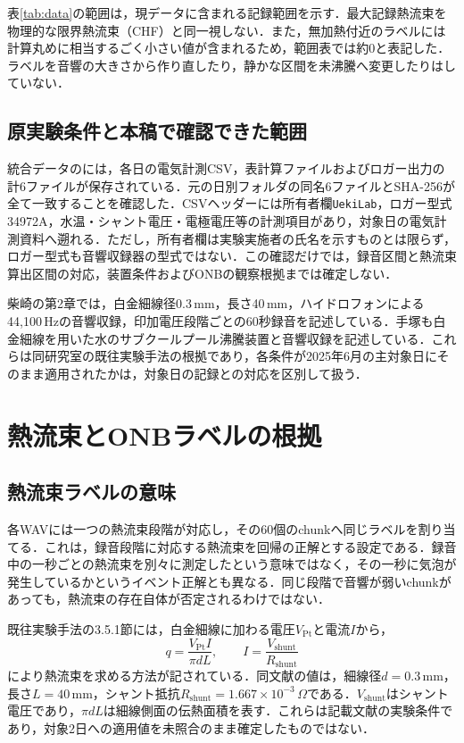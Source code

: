 表\ref{tab:data}の範囲は，現データに含まれる記録範囲を示す．最大記録熱流束を物理的な限界熱流束（CHF）と同一視しない．また，無加熱付近のラベルには計算丸めに相当するごく小さい値が含まれるため，範囲表では約0と表記した．ラベルを音響の大きさから作り直したり，静かな区間を未沸騰へ変更したりはしていない．

\subsection{原実験条件と本稿で確認できた範囲}
統合データのには，各日の電気計測CSV，表計算ファイルおよびロガー出力の計6ファイルが保存されている．元の日別フォルダの同名6ファイルとSHA-256が全て一致することを確認した\cite{localMetadata}．CSVヘッダーには所有者欄\texttt{UekiLab}，ロガー型式34972A，水温・シャント電圧・電極電圧等の計測項目があり，対象日の電気計測資料へ遡れる．ただし，所有者欄は実験実施者の氏名を示すものとは限らず，ロガー型式も音響収録器の型式ではない．この確認だけでは，録音区間と熱流束算出区間の対応，装置条件およびONBの観察根拠までは確定しない．

柴崎\cite{shibasaki2025}の第2章では，白金細線径0.3\,mm，長さ40\,mm，ハイドロフォンによる44,100\,Hzの音響収録，印加電圧段階ごとの60秒録音を記述している．手塚\cite{tezuka2026}も白金細線を用いた水のサブクールプール沸騰装置と音響収録を記述している．これらは同研究室の既往実験手法の根拠であり，各条件が2025年6月の主対象日にそのまま適用されたかは，対象日の記録との対応を区別して扱う．


\section{熱流束とONBラベルの根拠}
\subsection{熱流束ラベルの意味}
各WAVには一つの熱流束段階が対応し，その60個のchunkへ同じラベルを割り当てる．これは，録音段階に対応する熱流束を回帰の正解とする設定である．録音中の一秒ごとの熱流束を別々に測定したという意味ではなく，その一秒に気泡が発生しているかというイベント正解とも異なる．同じ段階で音響が弱いchunkがあっても，熱流束の存在自体が否定されるわけではない．

既往実験手法の3.5.1節\cite{shibasaki2025}には，白金細線に加わる電圧$V_{\mathrm{Pt}}$と電流$I$から，
\begin{equation}\label{eq:heat_flux_source}
 q=\frac{V_{\mathrm{Pt}}I}{\pi dL},\qquad
 I=\frac{V_{\mathrm{shunt}}}{R_{\mathrm{shunt}}}
\end{equation}
により熱流束を求める方法が記されている．同文献の値は，細線径$d=0.3$\,mm，長さ$L=40$\,mm，シャント抵抗$R_{\mathrm{shunt}}=1.667\times10^{-3}$\,$\Omega$である．$V_{\mathrm{shunt}}$はシャント電圧であり，$\pi dL$は細線側面の伝熱面積を表す．これらは記載文献の実験条件であり，対象2日への適用値を未照合のまま確定したものではない．

